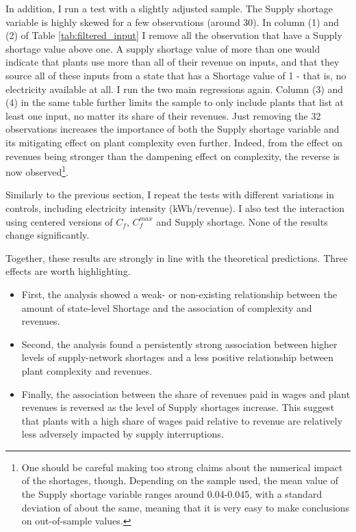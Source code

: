 \documentclass[11pt]{article}
\begin{document}
In addition, I run a test with a slightly adjusted sample. The Supply shortage variable is highly skewed for a few observations (around 30). In column (1) and (2) of Table \ref{tab:filtered_input} I remove all the observation that have a Supply shortage value above one. A supply shortage value of more than one would indicate that plants use more than all of their revenue on inputs, and that they source all of these inputs from a state that has a Shortage value of 1 -  that is, no electricity available at all. I run the two main regressions again. Column (3) and (4) in the same table further limits the sample to only include plants that list at least one input, no matter its share of their revenues. Just removing the 32 observations increases the importance of both the Supply shortage variable and its mitigating effect on plant complexity even further. Indeed, from the effect on revenues being stronger than the dampening effect on complexity, the reverse is now observed\footnote{One should be careful making too strong claims about the numerical impact of the shortages, though. Depending on the sample used, the mean value of the Supply shortage variable ranges around 0.04-0.045, with a standard deviation of about the same, meaning that it is very easy to make conclusions on out-of-sample values.}.

Similarly to the previous section, I repeat the tests with different variations in controls, including electricity intensity (kWh/revenue). I also test the interaction using centered versions of $C_f$, $C^{max}_f$ and Supply shortage. None of the results change significantly. 

Together, these results are strongly in line with the theoretical predictions. Three effects are worth highlighting. 

\begin{itemize}
	\item First, the analysis showed a weak- or non-existing relationship between the amount of state-level Shortage and the association of complexity and revenues.
	\item Second, the analysis found a persistently strong association between higher levels of supply-network shortages and a less positive relationship between plant complexity and revenues.

	\item Finally, the association between the share of revenues paid in wages and plant revenues is reversed as the level of Supply shortages increase. This suggest that plants with a high share of wages paid relative to revenue are relatively less adversely impacted by supply interruptions.
	\end{itemize}
\end{document}
